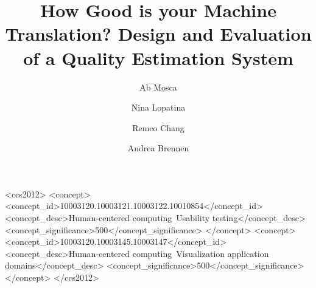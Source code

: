\documentclass[manuscript,screen, anonymous]{acmart}
\begin{document}
\title[How Good is your Machine Translation?]{How Good is your Machine Translation? Design and Evaluation of a Quality Estimation System}

\author{Ab Mosca}

\author{Nina Lopatina}
\authornotemark[1]

\author{Remco Chang}

\author{Andrea Brennen}

\renewcommand{\shortauthors}{Mosca and Brennen, et al.}

\begin{abstract}
  
\end{abstract}

\begin{CCSXML}
<ccs2012>
<concept>
<concept_id>10003120.10003121.10003122.10010854</concept_id>
<concept_desc>Human-centered computing~Usability testing</concept_desc>
<concept_significance>500</concept_significance>
</concept>
<concept>
<concept_id>10003120.10003145.10003147</concept_id>
<concept_desc>Human-centered computing~Visualization application domains</concept_desc>
<concept_significance>500</concept_significance>
</concept>
</ccs2012>
\end{CCSXML}

\end{document}
